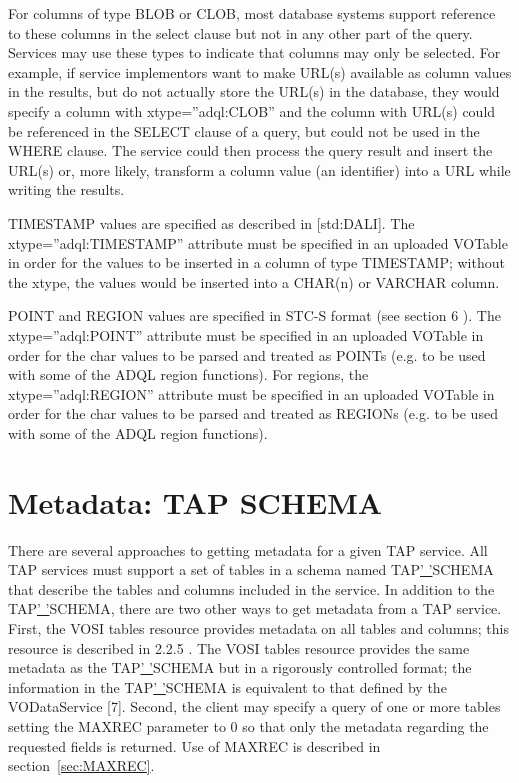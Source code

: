 \documentclass[11pt,letter]{ivoa}
\begin{document}
{For columns of type BLOB or CLOB, most database systems support reference to 
these columns in the select clause but not in any other part of the query. 
Services may use these types to indicate that columns may only be selected. For 
example, if service implementors want to make URL(s) available as column values 
in the results, but do not actually store the URL(s) in the database, they would 
specify a column with xtype=”adql:CLOB” and the column with URL(s) could be 
referenced in the SELECT clause of a query, but could not be used in the WHERE 
clause. The service could then process the query result and insert the URL(s) 
or, more likely, transform a column value (an identifier) into a URL while 
writing the results.

TIMESTAMP values are specified as described in [std:DALI]. The 
xtype=”adql:TIMESTAMP” attribute must be specified in an uploaded VOTable in 
order for the values to be inserted in a column of type TIMESTAMP; without the 
xtype, the values would be inserted into a CHAR(n) or VARCHAR column.

POINT and REGION values are specified in STC-S format (see section 6 ). The 
xtype=”adql:POINT” attribute must be specified in an uploaded VOTable in order 
for the char values to be parsed and treated as POINTs (e.g. to be used with 
some of the ADQL region functions). For regions, the xtype=”adql:REGION” 
attribute must be specified in an uploaded VOTable in order for the char values 
to be parsed and treated as REGIONs (e.g. to be used with some of the ADQL 
region functions).

\section{Metadata: TAP SCHEMA}
\label{sec:tap-schema}

There are several approaches to getting metadata for a given TAP service. All 
TAP services must support a set of tables in a schema named 
TAP\underline{' '}SCHEMA that describe the tables and columns included in the 
service. In addition to the TAP\underline{' '}SCHEMA, there are two other ways 
to get metadata from a TAP service. First, the VOSI tables resource provides 
metadata on all tables and columns; this resource is described in 2.2.5 . The 
VOSI tables resource provides the same metadata as the TAP\underline{' '}SCHEMA 
but in a rigorously controlled format; the information in the 
TAP\underline{' '}SCHEMA is equivalent to that defined by the  VODataService 
[7]. Second, the client may specify a query of one or more tables setting the 
MAXREC parameter to 0 so that only the metadata regarding the requested fields 
is returned. Use of MAXREC is described in section~\ref{sec:MAXREC}.

}
\end{document}

